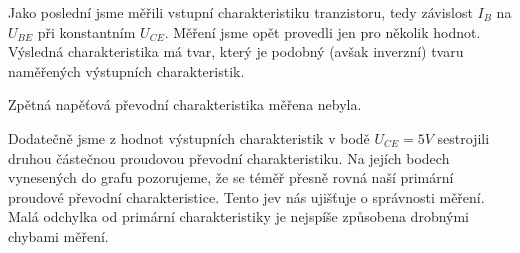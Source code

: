 \documentclass[a4paper, czech]{article}
\begin{document}
Jako poslední jsme měřili vstupní charakteristiku tranzistoru, tedy závislost $I_B$ na $U_{BE}$ při konstantním $U_{CE}$.
Měření jsme opět provedli jen pro několik hodnot.
Výsledná charakteristika má tvar, který je podobný (avšak inverzní) tvaru naměřených výstupních charakteristik.

Zpětná napěťová převodní charakteristika měřena nebyla.

Dodatečně jsme z hodnot výstupních charakteristik v bodě $U_{CE} = 5V$ sestrojili druhou částečnou proudovou převodní charakteristiku.
Na jejích bodech vynesených do grafu pozorujeme, že se téměř přesně rovná naší primární proudové převodní charakteristice.
Tento jev nás ujišťuje o správnosti měření.
Malá odchylka od primární charakteristiky je nejspíše způsobena drobnými chybami měření.
\end{document}
